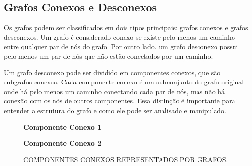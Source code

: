 \subsection{Grafos Conexos e Desconexos}

Os grafos podem ser classificados em dois tipos principais: grafos conexos e grafos desconexos. Um grafo é considerado conexo se existe pelo menos um caminho entre qualquer par de nós do grafo. Por outro lado, um grafo desconexo possui pelo menos um par de nós que não estão conectados por um caminho.

Um grafo desconexo pode ser dividido em componentes conexos, que são subgrafos conexos. Cada componente conexo é um subconjunto do grafo original onde há pelo menos um caminho conectando cada par de nós, mas não há conexão com os nós de outros componentes. Essa distinção é importante para entender a estrutura do grafo e como ele pode ser analisado e manipulado.


\begin{figure}[ht]
    \caption{COMPONENTES CONEXOS REPRESENTADOS POR GRAFOS.}
    \centering
    \begin{minipage}{0.45\textwidth}
        \centering
        \textbf{Componente Conexo 1} \\[0.2cm]
    \end{minipage}
    \hfill
    \begin{minipage}{0.45\textwidth}
        \centering
        \textbf{Componente Conexo 2} \\[0.2cm]
    \end{minipage}
    \label{fig:componentes_conexos}
    \end{figure}

